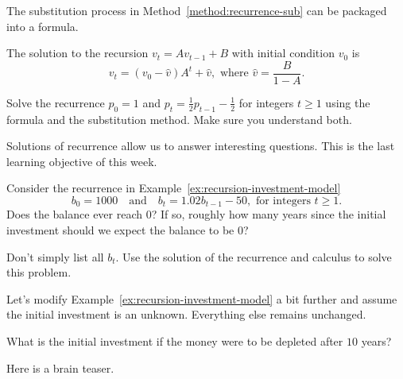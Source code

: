 \documentclass[../main.tex]{subfiles}
\begin{document}
The substitution process in Method~\ref{method:recurrence-sub} can be packaged into a formula.
\begin{method} \label{method:recurrence-affine-formula}
  The solution to the recursion \(v_{t} = A v_{t-1} + B\) with initial condition \(v_{0}\) is
  \[
    v_{t} = (v_{0} - \hat{v}) A^{t} + \hat{v}, \text{ where } \hat{v} = \frac{B}{1 - A}.
  \]
\end{method}

\begin{exercise} \label{ex:recurrence-formula-vs-sub}
  Solve the recurrence \(p_{0} = 1\) and \(p_{t} = \frac{1}{2} p_{t-1} - \frac{1}{2}\) for integers \(t \ge 1\) using the formula and the substitution method. Make sure you understand both.

  \blanks*
\end{exercise}

\clearpage

Solutions of recurrence allow us to answer interesting questions.  This is the last learning objective of this week.
\begin{example} \label{ex:recurrence-balance-zero}
  Consider the recurrence in Example~\ref{ex:recursion-investment-model} 
  \[
    b_{0} = 1000 \quad\text{and}\quad b_{t} = 1.02 b_{t-1} - 50, \text{ for integers } t \ge 1. 
  \] 
  Does the balance ever reach \(0\)? If so, roughly how many years since the initial investment should we expect the balance to be \(0\)? 
  
  Don't simply list all \(b_{t}\). Use the solution of the recurrence and calculus to solve this problem.

  \blanks*
\end{example}
\clearpage

\begin{exercise} \label{ex:recurrence-unknown-initial}
  Let's modify Example~\ref{ex:recursion-investment-model} a bit further and assume the initial investment is an unknown.  Everything else remains unchanged.  

  What is the initial investment if the money were to be depleted after \(10\) years?

  \blanks*
\end{exercise}
\clearpage

Here is a brain teaser.
\end{document}
